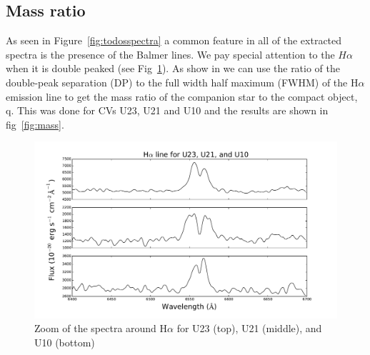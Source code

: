 \subsection{Mass ratio}

As seen in Figure~\ref{fig:todosspectra} a common feature in all of the extracted spectra is the presence of the Balmer lines. We pay special attention to the $H\alpha$ when it is double peaked (see Fig~\ref{fig:halphatodos}). As show in \cite{casares_massration_20016} we can use the ratio of the double-peak separation (DP) to the full width half maximum (FWHM) of the H$\alpha$ emission line to get the mass ratio of the companion star to the compact object, q. This was done for CVs U23, U21 and U10 and the results are shown in fig~\ref{fig:mass}.

\begin{figure}[h]
        \centering
        \includegraphics[scale=.5]{assets/images/todos.pdf}
\caption{Zoom of the spectra around H$\alpha$ for U23 (top), U21 (middle), and U10 (bottom)}
\label{fig:halphatodos}
\end{figure}

